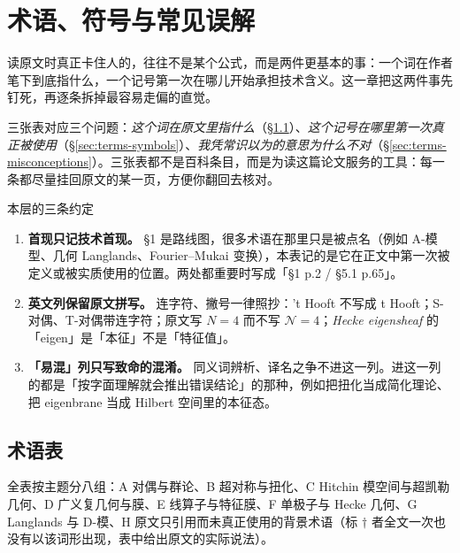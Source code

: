 
\section{术语、符号与常见误解}

读原文时真正卡住人的，往往不是某个公式，而是两件更基本的事：一个词在作者笔下到底指什么，一个记号第一次在哪儿开始承担技术含义。这一章把这两件事先钉死，再逐条拆掉最容易走偏的直觉。

三张表对应三个问题：\emph{这个词在原文里指什么}（\S\ref{sec:terms-glossary}）、\emph{这个记号在哪里第一次真正被使用}（\S\ref{sec:terms-symbols}）、\emph{我凭常识以为的意思为什么不对}（\S\ref{sec:terms-misconceptions}）。三张表都不是百科条目，而是为读这篇论文服务的工具：每一条都尽量挂回原文的某一页，方便你翻回去核对。

\begin{kcard}{本层的三条约定}
\begin{enumerate}[label=\arabic*.,leftmargin=1.7em,itemsep=2pt]
  \item \textbf{首现只记技术首现。} \S1 是路线图，很多术语在那里只是被点名（例如 A-模型、几何 Langlands、Fourier--Mukai 变换），本表记的是它在正文中第一次被定义或被实质使用的位置。两处都重要时写成「\S1 p.2 / \S5.1 p.65」。
  \item \textbf{英文列保留原文拼写。} 连字符、撇号一律照抄：'t Hooft 不写成 t Hooft；S-对偶、T-对偶带连字符；原文写 $N=4$ 而不写 $\mathcal{N}=4$；\emph{Hecke eigensheaf} 的「eigen」是「本征」不是「特征值」。
  \item \textbf{「易混」列只写致命的混淆。} 同义词辨析、译名之争不进这一列。进这一列的都是「按字面理解就会推出错误结论」的那种，例如把扭化当成简化理论、把 eigenbrane 当成 Hilbert 空间里的本征态。
\end{enumerate}
\end{kcard}

\subsection{术语表}\label{sec:terms-glossary}

全表按主题分八组：A 对偶与群论、B 超对称与扭化、C Hitchin 模空间与超凯勒几何、D 广义复几何与膜、E 线算子与特征膜、F 单极子与 Hecke 几何、G Langlands 与 D-模、H 原文只引用而未真正使用的背景术语（标 $\dagger$ 者全文一次也没有以该词形出现，表中给出原文的实际说法）。

